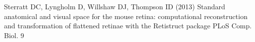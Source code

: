 \documentclass{book}
\begin{document}


\begin{thebibliography}{99}
 Sterratt DC, Lyngholm D, Willshaw DJ,
  Thompson ID (2013) Standard anatomical and visual space for the
  mouse retina: computational reconstruction and transformation of
  flattened retinae with the Retistruct package \newblock PLoS
  Comp. Biol. 9
\end{thebibliography}
\end{document}
